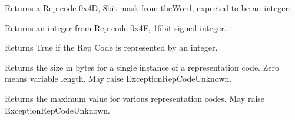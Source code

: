 \documentclass[letterpaper,10pt,english]{sphinxmanual}
\begin{document}

\begin{fulllineitems}
\label{\detokenize{ref/LIS/core/RepCode:TotalDepth.LIS.core.pRepCode.from77}}
Returns a Rep code 0x4D, 8bit mask from theWord, expected to be an integer.

\end{fulllineitems}


\begin{fulllineitems}
\label{\detokenize{ref/LIS/core/RepCode:TotalDepth.LIS.core.pRepCode.from79}}
Returns an integer from Rep code 0x4F, 16bit signed integer.

\end{fulllineitems}


\begin{fulllineitems}
\label{\detokenize{ref/LIS/core/RepCode:TotalDepth.LIS.core.pRepCode.isInt}}
Returns True if the Rep Code is represented by an integer.

\end{fulllineitems}


\begin{fulllineitems}
\label{\detokenize{ref/LIS/core/RepCode:TotalDepth.LIS.core.pRepCode.lisSize}}
Returns the size in bytes for a single instance of a representation code.
Zero means variable length. May raise ExceptionRepCodeUnknown.

\end{fulllineitems}


\begin{fulllineitems}
\label{\detokenize{ref/LIS/core/RepCode:TotalDepth.LIS.core.pRepCode.maxValue}}
Returns the maximum value for various representation codes.
May raise ExceptionRepCodeUnknown.

\end{fulllineitems}
\end{document}

